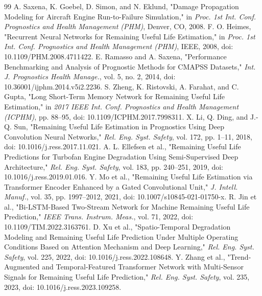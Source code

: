 \documentclass[review,12pt]{elsarticle}
\begin{document}
\begin{thebibliography}{99}
  A. Saxena, K. Goebel, D. Simon, and N. Eklund, "Damage Propagation Modeling for Aircraft Engine Run-to-Failure Simulation," in \textit{Proc. 1st Int. Conf. Prognostics and Health Management (PHM)}, Denver, CO, 2008.
  F. O. Heimes, "Recurrent Neural Networks for Remaining Useful Life Estimation," in \textit{Proc. 1st Int. Conf. Prognostics and Health Management (PHM)}, IEEE, 2008, doi: 10.1109/PHM.2008.4711422.
  E. Ramasso and A. Saxena, "Performance Benchmarking and Analysis of Prognostic Methods for CMAPSS Datasets," \textit{Int. J. Prognostics Health Manage.}, vol. 5, no. 2, 2014, doi: 10.36001/ijphm.2014.v5i2.2236.
  S. Zheng, K. Ristovski, A. Farahat, and C. Gupta, "Long Short-Term Memory Network for Remaining Useful Life Estimation," in \textit{2017 IEEE Int. Conf. Prognostics and Health Management (ICPHM)}, pp. 88–95, doi: 10.1109/ICPHM.2017.7998311.
  X. Li, Q. Ding, and J.-Q. Sun, "Remaining Useful Life Estimation in Prognostics Using Deep Convolution Neural Networks," \textit{Rel. Eng. Syst. Safety}, vol. 172, pp. 1–11, 2018, doi: 10.1016/j.ress.2017.11.021.
  A. L. Ellefsen et al., "Remaining Useful Life Predictions for Turbofan Engine Degradation Using Semi-Supervised Deep Architecture," \textit{Rel. Eng. Syst. Safety}, vol. 183, pp. 240–251, 2019, doi: 10.1016/j.ress.2019.01.016.
  Y. Mo et al., "Remaining Useful Life Estimation via Transformer Encoder Enhanced by a Gated Convolutional Unit," \textit{J. Intell. Manuf.}, vol. 35, pp. 1997–2012, 2021, doi: 10.1007/s10845-021-01750-x.
  R. Jin et al., "Bi-LSTM-Based Two-Stream Network for Machine Remaining Useful Life Prediction," \textit{IEEE Trans. Instrum. Meas.}, vol. 71, 2022, doi: 10.1109/TIM.2022.3163761.
  D. Xu et al., "Spatio-Temporal Degradation Modeling and Remaining Useful Life Prediction Under Multiple Operating Conditions Based on Attention Mechanism and Deep Learning," \textit{Rel. Eng. Syst. Safety}, vol. 225, 2022, doi: 10.1016/j.ress.2022.108648.
  Y. Zhang et al., "Trend-Augmented and Temporal-Featured Transformer Network with Multi-Sensor Signals for Remaining Useful Life Prediction," \textit{Rel. Eng. Syst. Safety}, vol. 235, 2023, doi: 10.1016/j.ress.2023.109258.

\end{thebibliography}
\end{document}
